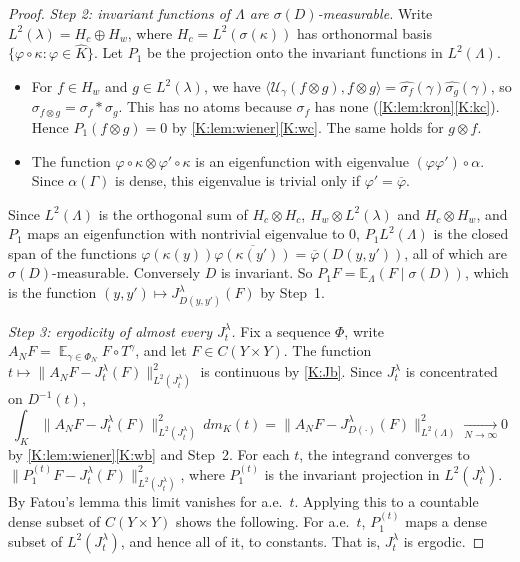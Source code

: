 \begin{proof}
\emph{Step 2: invariant functions of $\Lambda$ are $\sigma(D)$-measurable.}
Write $L^2(\lambda)=H_c\oplus H_w$, where $H_c=L^2(\sigma(\kappa))$ has orthonormal basis
$\{\varphi\circ\kappa:\varphi\in\widehat K\}$. Let $P_1$ be the projection onto the
invariant functions in $L^2(\Lambda)$.
\begin{itemize}
\item For $f\in H_w$ and $g\in L^2(\lambda)$, we have
$\langle\mathcal U_\gamma(f\otimes g),f\otimes g\rangle=\widehat{\sigma_f}(\gamma)\widehat{\sigma_g}(\gamma)$,
so $\sigma_{f\otimes g}=\sigma_f*\sigma_g$. This has no atoms because $\sigma_f$ has none
(\cref{K:lem:kron}\ref{K:kc}). Hence $P_1(f\otimes g)=0$ by \cref{K:lem:wiener}\ref{K:wc}.
The same holds for $g\otimes f$.
\item The function $\varphi\circ\kappa\otimes\varphi'\circ\kappa$ is an eigenfunction with
eigenvalue $(\varphi\varphi')\circ\alpha$. Since $\alpha(\Gamma)$ is dense, this eigenvalue
is trivial only if $\varphi'=\overline\varphi$.
\end{itemize}
Since $L^2(\Lambda)$ is the orthogonal sum of $H_c\otimes H_c$, $H_w\otimes L^2(\lambda)$ and
$H_c\otimes H_w$, and $P_1$ maps an eigenfunction with nontrivial eigenvalue to $0$,
$P_1L^2(\Lambda)$ is the closed span of the functions
$\varphi(\kappa(y))\overline{\varphi(\kappa(y'))}=\overline{\varphi}(D(y,y'))$, all of
which are $\sigma(D)$-measurable. Conversely $D$ is invariant.
So $P_1F=\mathbb E_\Lambda(F\mid\sigma(D))$, which is the function
$(y,y')\mapsto J^\lambda_{D(y,y')}(F)$ by Step~1.

\emph{Step 3: ergodicity of almost every $J^\lambda_t$.}
Fix a \Fol{} sequence $\Phi$, write
$A_NF=\mathop{\mathbb E}_{\gamma\in\Phi_N}F\circ T^\gamma$, and let $F\in C(Y\times Y)$.
The function $t\mapsto\|A_NF-J^\lambda_t(F)\|^2_{L^2(J^\lambda_t)}$ is continuous by \ref{K:Jb}.
Since $J^\lambda_t$ is concentrated on $D^{-1}(t)$,
\[
\int_K\big\|A_NF-J^\lambda_t(F)\big\|^2_{L^2(J^\lambda_t)}\,dm_K(t)
=\big\|A_NF-J^\lambda_{D(\cdot)}(F)\big\|^2_{L^2(\Lambda)}\xrightarrow[N\to\infty]{}0
\]
by \cref{K:lem:wiener}\ref{K:wb} and Step~2.
For each $t$, the integrand converges to $\|P^{(t)}_1F-J^\lambda_t(F)\|^2_{L^2(J^\lambda_t)}$,
where $P^{(t)}_1$ is the invariant projection in $L^2(J^\lambda_t)$.
By Fatou's lemma this limit vanishes for a.e.\ $t$.
Applying this to a countable dense subset of $C(Y\times Y)$ shows the following. For a.e.\
$t$, $P^{(t)}_1$ maps a dense subset of $L^2(J^\lambda_t)$, and hence all of it, to
constants. That is, $J^\lambda_t$ is ergodic.
\end{proof}

